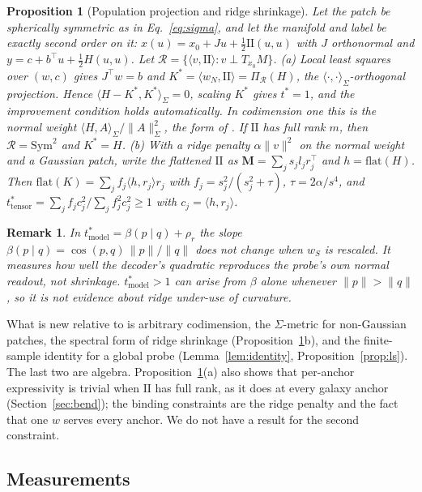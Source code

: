 \documentclass[10pt]{article}
\newtheorem{proposition}{Proposition}
\newtheorem{remark}{Remark}
\newcommand{\norm}[1]{\lVert #1 \rVert}
\newcommand{\II}{\mathrm{II}}
\newcommand{\tmodel}{t^*_{\mathrm{model}}}
\begin{document}
\begin{proposition}[Population projection and ridge shrinkage]\label{prop:pop}
Let the patch be spherically symmetric as in Eq.~\eqref{eq:sigma}, and let the manifold and label be exactly second order on it: $x(u)=x_0+Ju+\tfrac12\II(u,u)$ with $J$ orthonormal and $y=c+b^\top u+\tfrac12H(u,u)$. Let $\mathcal{R}=\{\langle v,\II\rangle:v\perp T_{x_0}M\}$. (a) Local least squares over $(w,c)$ gives $J^\top w=b$ and $K^*=\langle w_N,\II\rangle=\Pi_{\mathcal R}(H)$, the $\langle\cdot,\cdot\rangle_\Sigma$-orthogonal projection. Hence $\langle H-K^*,K^*\rangle_\Sigma=0$, scaling $K^*$ gives $t^*=1$, and the improvement condition holds automatically. In codimension one this is the normal weight $\langle H,A\rangle_\Sigma/\norm{A}^2_\Sigma$, the form of \citet[Thm.~2.4]{liu2023linear}. If $\II$ has full rank $m$, then $\mathcal R=\mathrm{Sym}^2$ and $K^*=H$. (b) With a ridge penalty $\alpha\norm{v}^2$ on the normal weight and a Gaussian patch, write the flattened $\II$ as $\mathbf{M}=\sum_js_jl_jr_j^\top$ and $h=\mathrm{flat}(H)$. Then $\mathrm{flat}(K)=\sum_jf_j\langle h,r_j\rangle r_j$ with $f_j=s_j^2/(s_j^2+\tau)$, $\tau=2\alpha/s^4$, and $t^*_{\mathrm{tensor}}=\sum_jf_jc_j^2/\sum_jf_j^2c_j^2\ge1$ with $c_j=\langle h,r_j\rangle$.
\end{proposition}

\begin{remark}\label{rem:fidelity}
In $\tmodel=\beta(p\mid q)+\rho_r$ the slope $\beta(p\mid q)=\cos(p,q)\,\norm{p}/\norm{q}$ does not change when $w_S$ is rescaled. It measures how well the decoder's quadratic reproduces the probe's own normal readout, not shrinkage. $\tmodel>1$ can arise from $\beta$ alone whenever $\norm{p}>\norm{q}$, so it is not evidence about ridge under-use of curvature.
\end{remark}

What is new relative to \citet{liu2023linear} is arbitrary codimension, the $\Sigma$-metric for non-Gaussian patches, the spectral form of ridge shrinkage (Proposition~\ref{prop:pop}b), and the finite-sample identity for a global probe (Lemma~\ref{lem:identity}, Proposition~\ref{prop:ls}). The last two are algebra. Proposition~\ref{prop:pop}(a) also shows that per-anchor expressivity is trivial when $\II$ has full rank, as it does at every galaxy anchor (Section~\ref{sec:bend}); the binding constraints are the ridge penalty and the fact that one $w$ serves every anchor. We do not have a result for the second constraint.

\subsection{Measurements}
\end{document}

